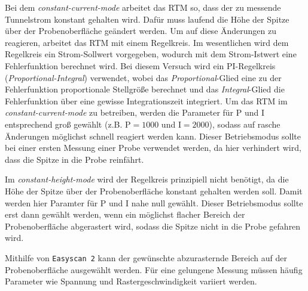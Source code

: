 Bei dem \textit{constant-current-mode} arbeitet das RTM so, dass der zu messende Tunnelstrom konstant gehalten wird. Dafür muss laufend die Höhe der Spitze
über der Probenoberfläche geändert werden. Um auf diese Änderungen zu reagieren, arbeitet das RTM mit einem Regelkreis. Im wesentlichen wird dem Regelkreis
ein Strom-Sollwert vorgegeben, wodurch mit dem Strom-Istwert eine Fehlerfunktion berechnet wird. Bei diesem Versuch wird ein PI-Regelkreis (\textit{Proportional-Integral}) verwendet,
wobei das \textit{Proportional}-Glied eine zu der Fehlerfunktion proportionale Stellgröße berechnet und das \textit{Integral}-Glied die Fehlerfunktion über eine gewisse
Integrationszeit integriert. Um das RTM im \textit{constant-current-mode} zu betreiben, werden die Parameter für P und I entsprechend groß gewählt (z.B. $\mathrm{P} = 1000$ und $\mathrm{I} = 2000$),
sodass auf rasche Änderungen möglichst schnell reagiert werden kann. Dieser Betriebsmodus sollte bei einer ersten Messung einer Probe verwendet werden, da hier verhindert wird,
dass die Spitze in die Probe reinfährt.\par
Im \textit{constant-height-mode} wird der Regelkreis prinzipiell nicht benötigt, da die Höhe der Spitze über der Probenoberfläche konstant gehalten werden soll.
Damit werden hier Paramter für P und I nahe null gewählt. Dieser Betriebsmodus sollte erst dann gewählt werden, wenn ein möglichst flacher Bereich der Probenoberfläche abgerastert wird,
sodass die Spitze nicht in die Probe gefahren wird.\par
Mithilfe von \texttt{Easyscan 2} kann der gewünschte abzurasternde Bereich auf der Probenoberfläche ausgewählt werden. Für eine gelungene Messung müssen häufig Parameter wie Spannung
und Rastergeschwindigkeit variiert werden.